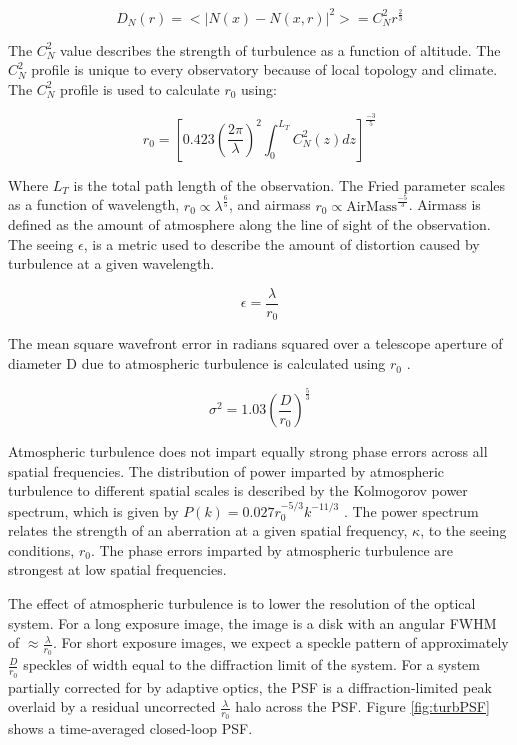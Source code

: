 \begin{equation}
    D_N(r)=<|N(x)-N(x,r)|^2>=C_N^2r^{\frac{2}{3}}
\end{equation}

The $C_N^2$ value describes the strength of turbulence as a function of altitude. The $C_N^2$ profile is unique to every observatory because of local topology and climate. The $C_N^2$ profile is used to calculate $r_0$ using:

\begin{equation}
    r_0=[0.423(\frac{2\pi}{\lambda})^2 \int_0^{L_T} C_N^2(z)dz]^{\frac{-3}{5}}
\end{equation}
 
 Where $L_T$ is the total path length of the observation. The Fried parameter scales as a function of wavelength, $r_0 \propto \lambda^{\frac{6}{5}}$, and airmass $r_0 \propto \text{AirMass}^{\frac{-5}{3}}$. Airmass is defined as the amount of atmosphere along the line of sight of the observation. The seeing $\epsilon$, is a metric used to describe the amount of distortion caused by turbulence at a given wavelength.
 
 \begin{equation}
     \epsilon=\frac{\lambda}{r_0}
 \end{equation}
 
 The mean square wavefront error in radians squared over a telescope aperture of diameter D due to atmospheric turbulence is calculated using $r_0$ \citep{noll1976zernike}.
 
 \begin{equation}
     \sigma^2=1.03(\frac{D}{r_0})^{\frac{5}{3}}
 \end{equation}


Atmospheric turbulence does not impart equally strong phase errors across all spatial frequencies. The distribution of power imparted by atmospheric turbulence to different spatial scales is described by the Kolmogorov power spectrum, which is given by $P(k)=0.027r_0^{-5/3}k^{-11/3}$  \citep{rampy2012production}. The power spectrum relates the strength of an aberration at a given spatial frequency, $\kappa$, to the seeing conditions, $r_0$. The phase errors imparted by atmospheric turbulence are strongest at low spatial frequencies.

The effect of atmospheric turbulence is to lower the resolution of the optical system. For a long exposure image, the image is a disk with an angular FWHM of $\approx \frac{\lambda}{r_0 }$. For short exposure images, we expect a speckle pattern of approximately $\frac{D}{r_0}$ speckles of width equal to the diffraction limit of the system. For a system partially corrected for by adaptive optics, the PSF is a diffraction-limited peak overlaid by a residual uncorrected $\frac{\lambda}{r_0}$ halo across the PSF. Figure \ref{fig:turbPSF} shows a time-averaged closed-loop PSF.

